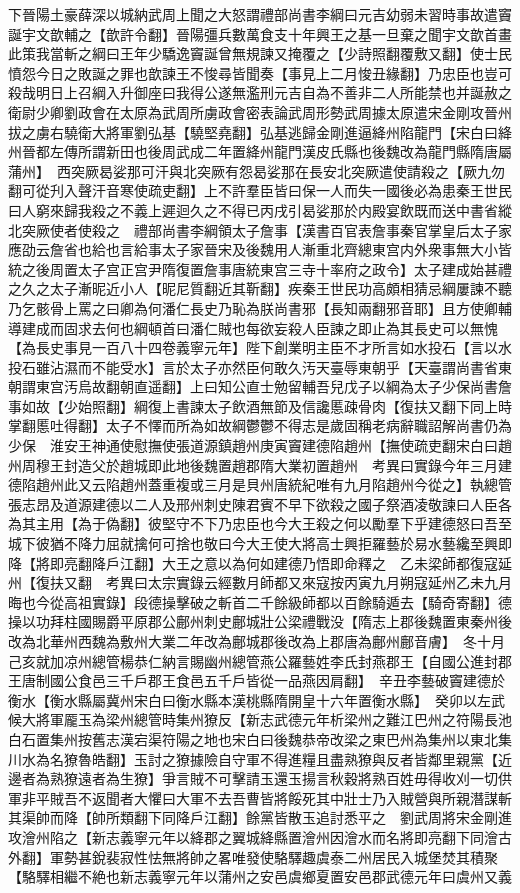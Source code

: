 下晉陽土豪薛深以城納武周上聞之大怒謂禮部尚書李綱曰元吉幼弱未習時事故遣竇誕宇文歆輔之【歆許令翻】晉陽彊兵數萬食支十年興王之基一旦棄之聞宇文歆首畫此策我當斬之綱曰王年少驕逸竇誕曾無規諫又掩覆之【少詩照翻覆敷又翻】使士民憤怨今日之敗誕之罪也歆諫王不悛尋皆聞奏【事見上二月悛丑緣翻】乃忠臣也豈可殺哉明日上召綱入升御座曰我得公遂無濫刑元吉自為不善非二人所能禁也并誕赦之衛尉少卿劉政會在太原為武周所虜政會密表論武周形勢武周據太原遣宋金剛攻晉州拔之虜右驍衛大將軍劉弘基【驍堅堯翻】弘基逃歸金剛進逼絳州陷龍門【宋白曰絳州晉都左傳所謂新田也後周武成二年置絳州龍門漢皮氏縣也後魏改為龍門縣隋唐屬蒲州】　西突厥曷娑那可汗與北突厥有怨曷娑那在長安北突厥遣使請殺之【厥九勿翻可從刋入聲汗音寒使疏吏翻】上不許羣臣皆曰保一人而失一國後必為患秦王世民曰人窮來歸我殺之不義上遲迴久之不得已丙戌引曷娑那於内殿宴飲既而送中書省縱北突厥使者使殺之　禮部尚書李綱領太子詹事【漢書百官表詹事秦官掌皇后太子家應劭云詹省也給也言給事太子家晉宋及後魏用人漸重北齊總東宫内外衆事無大小皆統之後周置太子宫正宫尹隋復置詹事唐統東宫三寺十率府之政令】太子建成始甚禮之久之太子漸昵近小人【昵尼質翻近其靳翻】疾秦王世民功高頗相猜忌綱屢諫不聽乃乞骸骨上罵之曰卿為何潘仁長史乃恥為朕尚書邪【長知兩翻邪音耶】且方使卿輔導建成而固求去何也綱頓首曰潘仁賊也每欲妄殺人臣諫之即止為其長史可以無愧【為長史事見一百八十四卷義寧元年】陛下創業明主臣不才所言如水投石【言以水投石雖沾濕而不能受水】言於太子亦然臣何敢久汚天臺辱東朝乎【天臺謂尚書省東朝謂東宫汚烏故翻朝直遥翻】上曰知公直士勉留輔吾兒戊子以綱為太子少保尚書詹事如故【少始照翻】綱復上書諫太子飲酒無節及信讒慝疎骨肉【復扶又翻下同上時掌翻慝吐得翻】太子不懌而所為如故綱鬱鬱不得志是歲固稱老病辭職詔解尚書仍為少保　淮安王神通使慰撫使張道源鎮趙州庚寅竇建德陷趙州【撫使疏吏翻宋白曰趙州周穆王封造父於趙城即此地後魏置趙郡隋大業初置趙州　考異曰實錄今年三月建德陷趙州此又云陷趙州蓋重複或三月是貝州唐統紀唯有九月陷趙州今從之】執總管張志昂及道源建德以二人及邢州刺史陳君賓不早下欲殺之國子祭酒凌敬諫曰人臣各為其主用【為于偽翻】彼堅守不下乃忠臣也今大王殺之何以勵羣下乎建德怒曰吾至城下彼猶不降力屈就擒何可捨也敬曰今大王使大將高士興拒羅藝於易水藝纔至興即降【將即亮翻降戶江翻】大王之意以為何如建德乃悟即命釋之　乙未梁師都復寇延州【復扶又翻　考異曰太宗實錄云經數月師都又來寇按丙寅九月朔寇延州乙未九月晦也今從高祖實錄】段德操擊破之斬首二千餘級師都以百餘騎遁去【騎奇寄翻】德操以功拜柱國賜爵平原郡公鄜州刺史鄜城壯公梁禮戰没【隋志上郡後魏置東秦州後改為北華州西魏為敷州大業二年改為鄜城郡後改為上郡唐為鄜州鄜音膚】　冬十月己亥就加凉州總管楊恭仁納言賜幽州總管燕公羅藝姓李氏封燕郡王【自國公進封郡王唐制國公食邑三千戶郡王食邑五千戶皆從一品燕因肩翻】　辛丑李藝破竇建德於衡水【衡水縣屬冀州宋白曰衡水縣本漢桃縣隋開皇十六年置衡水縣】　癸卯以左武候大將軍龎玉為梁州總管時集州獠反【新志武德元年析梁州之難江巴州之符陽長池白石置集州按舊志漢宕渠符陽之地也宋白曰後魏恭帝改梁之東巴州為集州以東北集川水為名獠魯皓翻】玉討之獠據險自守軍不得進糧且盡熟獠與反者皆鄰里親黨【近邊者為熟獠遠者為生獠】爭言賊不可擊請玉還玉揚言秋穀將熟百姓毋得收刈一切供軍非平賊吾不返聞者大懼曰大軍不去吾曹皆將餒死其中壯士乃入賊營與所親潛謀斬其渠帥而降【帥所類翻下同降戶江翻】餘黨皆散玉追討悉平之　劉武周將宋金剛進攻澮州陷之【新志義寧元年以絳郡之翼城絳縣置澮州因澮水而名將即亮翻下同澮古外翻】軍勢甚銳裴寂性怯無將帥之畧唯發使駱驛趣虞泰二州居民入城堡焚其積聚【駱驛相繼不絶也新志義寧元年以蒲州之安邑虞鄉夏置安邑郡武德元年曰虞州又義